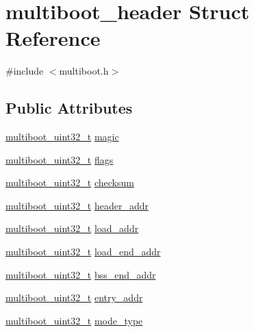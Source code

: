 \hypertarget{structmultiboot__header}{}\section{multiboot\+\_\+header Struct Reference}
\label{structmultiboot__header}


{\ttfamily \#include $<$multiboot.\+h$>$}

\subsection*{Public Attributes}
\begin{DoxyCompactItemize}
\item 
\hyperlink{multiboot_8h_a009f355da41fed4badb8a52d432f5186}{multiboot\+\_\+uint32\+\_\+t} \hyperlink{structmultiboot__header_a7fddee92e60ff58e159c6bf2c40bf29b}{magic}
\item 
\hyperlink{multiboot_8h_a009f355da41fed4badb8a52d432f5186}{multiboot\+\_\+uint32\+\_\+t} \hyperlink{structmultiboot__header_ab922f32c179ec7bde91519d19f27d95b}{flags}
\item 
\hyperlink{multiboot_8h_a009f355da41fed4badb8a52d432f5186}{multiboot\+\_\+uint32\+\_\+t} \hyperlink{structmultiboot__header_a17e73abddfe8264c254767a20099038d}{checksum}
\item 
\hyperlink{multiboot_8h_a009f355da41fed4badb8a52d432f5186}{multiboot\+\_\+uint32\+\_\+t} \hyperlink{structmultiboot__header_a9718b2fc6ce29a37e9a209f92ab856e3}{header\+\_\+addr}
\item 
\hyperlink{multiboot_8h_a009f355da41fed4badb8a52d432f5186}{multiboot\+\_\+uint32\+\_\+t} \hyperlink{structmultiboot__header_a99de1cf326c46c76c6039f317b7a1ef2}{load\+\_\+addr}
\item 
\hyperlink{multiboot_8h_a009f355da41fed4badb8a52d432f5186}{multiboot\+\_\+uint32\+\_\+t} \hyperlink{structmultiboot__header_ac9efc1a4c3cd18f286b2fd50ff052e31}{load\+\_\+end\+\_\+addr}
\item 
\hyperlink{multiboot_8h_a009f355da41fed4badb8a52d432f5186}{multiboot\+\_\+uint32\+\_\+t} \hyperlink{structmultiboot__header_ab4f2496ec9b0d1a95985929d281dfa19}{bss\+\_\+end\+\_\+addr}
\item 
\hyperlink{multiboot_8h_a009f355da41fed4badb8a52d432f5186}{multiboot\+\_\+uint32\+\_\+t} \hyperlink{structmultiboot__header_ac3d807775a9d69730e6698dcdcf6491e}{entry\+\_\+addr}
\item 
\hyperlink{multiboot_8h_a009f355da41fed4badb8a52d432f5186}{multiboot\+\_\+uint32\+\_\+t} \hyperlink{structmultiboot__header_a4c90b7929342dd5aab7d08afa0906d28}{mode\+\_\+type}

\end{DoxyCompactItemize}
